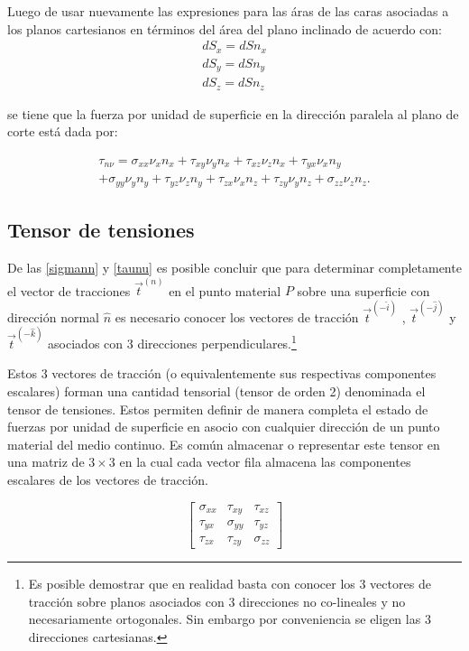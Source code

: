 \documentclass[../notas medios.tex]{subfiles}
\begin{document}
Luego de usar nuevamente las expresiones para las áras de las caras asociadas a los planos cartesianos en términos del área del plano inclinado de acuerdo con:
\begin{align*}
d{S_x} = dS{n_x}\\
d{S_y} = dS{n_y}\\
d{S_z} = dS{n_z}
\end{align*}

se tiene que la fuerza por unidad de superficie en la dirección paralela al plano de corte está dada por:

\begin{equation}
\begin{aligned}
{\tau _{n\nu}} = {\sigma _{xx}}{\nu_x}{n_x} + {\tau _{xy}}{\nu_y}{n_x} + {\tau _{xz}}{\nu_z}{n_x} + {\tau _{yx}}{\nu_x}{n_y}\\
 + {\sigma _{yy}}{\nu_y}{n_y} + {\tau _{yz}}{\nu_z}{n_y} + {\tau _{zx}}{\nu_x}{n_z} + {\tau _{zy}}{\nu_y}{n_z} + {\sigma _{zz}}{\nu_z}{n_z}.
\end{aligned}
\label{taunu}
\end{equation}

\subsection{Tensor de tensiones}
De las \cref{sigmann} y \cref{taunu} es posible concluir que para determinar
completamente el vector de tracciones ${{\vec t}^{(n)}}$ en el punto material
$P$ sobre una superficie con dirección normal $\hat{n}$ es necesario conocer los
vectores de tracción ${{\vec t}^{( - \hat i)}}$ , ${{\vec t}^{( - \hat j)}}$ y
${{\vec t}^{( - \hat k)}}$ asociados con 3 direcciones 
perpendiculares.\footnote{Es posible demostrar que en realidad basta con conocer los 3 vectores de tracción sobre planos asociados con 3 direcciones no co-lineales y no necesariamente ortogonales. Sin embargo por conveniencia se eligen las 3 direcciones cartesianas.}

Estos 3 vectores de tracción (o equivalentemente sus respectivas componentes
escalares) forman una cantidad tensorial (tensor de orden 2) denominada el
tensor de tensiones. Estos permiten definir de manera completa el estado de fuerzas
por unidad de superficie en asocio con cualquier dirección de un punto material del medio
continuo. Es común almacenar o representar este tensor en una matriz de $3
\times 3$ en la cual cada vector fila almacena las componentes escalares de los vectores de tracción.

\[\left[ {\begin{array}{*{20}{c}}
{{\sigma _{xx}}}&{{\tau _{xy}}}&{{\tau _{xz}}}\\
{{\tau _{yx}}}&{{\sigma _{yy}}}&{{\tau _{yz}}}\\
{{\tau _{zx}}}&{{\tau _{zy}}}&{{\sigma _{zz}}}
\end{array}} \right]\]
\end{document}
